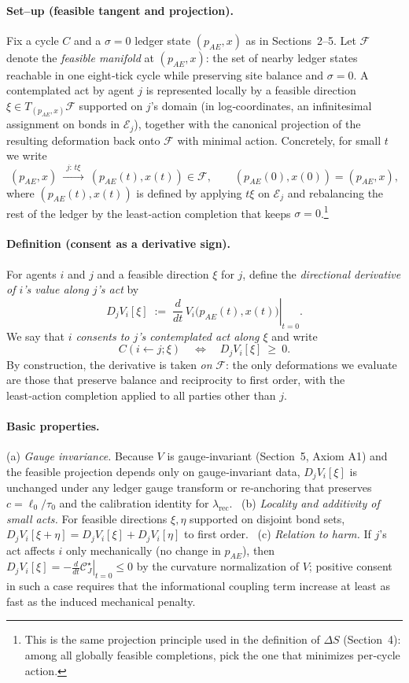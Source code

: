 \documentclass[11pt]{article}
\begin{document}
\paragraph{Set–up (feasible tangent and projection).}
Fix a cycle $C$ and a $\sigma\!=\!0$ ledger state $(p_{AE},x)$ as in Sections~2–5. Let $\mathcal{F}$ denote the \emph{feasible manifold} at $(p_{AE},x)$: the set of nearby ledger states reachable in one eight‑tick cycle while preserving site balance and $\sigma\!=\!0$. A contemplated act by agent $j$ is represented locally by a feasible direction $\xi\in T_{(p_{AE},x)}\mathcal{F}$ supported on $j$’s domain (in log‑coordinates, an infinitesimal assignment on bonds in $\mathcal E_j$), together with the canonical projection of the resulting deformation back onto $\mathcal{F}$ with minimal action. Concretely, for small $t$ we write
\[
(p_{AE},x)\ \xrightarrow{\ \ j:\,t\xi\ \ }\ (p_{AE}(t),x(t))\in \mathcal{F},\qquad
(p_{AE}(0),x(0))=(p_{AE},x),
\]
where $(p_{AE}(t),x(t))$ is defined by applying $t\xi$ on $\mathcal E_j$ and rebalancing the rest of the ledger by the least‑action completion that keeps $\sigma\!=\!0$.\footnote{This is the same projection principle used in the definition of $\Delta S$ (Section~4): among all globally feasible completions, pick the one that minimizes per‑cycle action.}

\paragraph{Definition (consent as a derivative sign).}
For agents $i$ and $j$ and a feasible direction $\xi$ for $j$, define the \emph{directional derivative of $i$’s value along $j$’s act} by
\[
D_j V_i[\xi]\;:=\;\left.\frac{d}{dt}\,V_i\!\big(p_{AE}(t),x(t)\big)\right|_{t=0}.
\]
We say that \emph{$i$ consents to $j$’s contemplated act along $\xi$} and write
\[
C(i\!\leftarrow\! j;\xi)
\quad\Longleftrightarrow\quad
D_j V_i[\xi]\ \ge\ 0.
\]
By construction, the derivative is taken \emph{on} $\mathcal{F}$: the only deformations we evaluate are those that preserve balance and reciprocity to first order, with the least‑action completion applied to all parties other than $j$.

\paragraph{Basic properties.}
(a) \emph{Gauge invariance.} Because $V$ is gauge‑invariant (Section~5, Axiom A1) and the feasible projection depends only on gauge‑invariant data, $D_j V_i[\xi]$ is unchanged under any ledger gauge transform or re‑anchoring that preserves $c=\ell_0/\tau_0$ and the calibration identity for $\lambda_{\mathrm{rec}}$. \
(b) \emph{Locality and additivity of small acts.} For feasible directions $\xi,\eta$ supported on disjoint bond sets, $D_j V_i[\xi+\eta]=D_j V_i[\xi]+D_j V_i[\eta]$ to first order. \
(c) \emph{Relation to harm.} If $j$’s act affects $i$ only mechanically (no change in $p_{AE}$), then $D_j V_i[\xi]=-\left.\frac{d}{dt}\mathcal{C}_J^\star\right|_{t=0}\le 0$ by the curvature normalization of $V$; positive consent in such a case requires that the informational coupling term increase at least as fast as the induced mechanical penalty.
\end{document}
